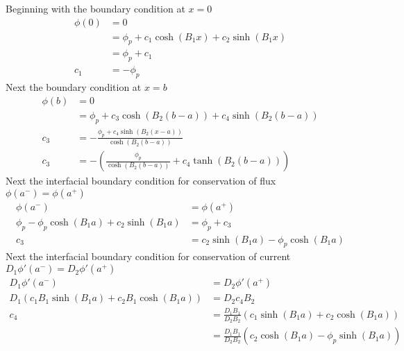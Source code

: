   Beginning with the boundary condition at $x=0$
  \begin{align}
    \phi(0) &= 0 \\
    &= \phi_p + c_1 \cosh(B_1 x) + c_2 \sinh(B_1 x) \\
    &= \phi_p + c_1\\
    c_1 &= -\phi_p \label{eq:bc_x0}
  \end{align}
  Next the boundary condition at $x=b$
  \begin{align}
    \phi(b) &= 0 \\
    &= \phi_p + c_3 \cosh(B_2 (b-a)) + c_4 \sinh(B_2 (b-a)) \\
    c_3 &= - \frac{\phi_p + c_4 \sinh(B_2(x-a))}{\cosh(B_2(b-a))} \\
    c_3 &= - \left(\frac{\phi_p}{\cosh(B_2(b-a))} + 
      c_4 \tanh(B_2(b-a))\right) \label{eq:bc_xb}
  \end{align}
  Next the interfacial boundary condition for conservation of flux
  $\phi(a^-)=\phi(a^+)$
  \begin{align}
    \phi(a^-) &= \phi(a^+) \\
    \phi_p - \phi_p \cosh(B_1 a) + c_2 \sinh(B_1 a) &= 
      \phi_p + c_3 \\
    c_3 &= c_2 \sinh(B_1 a) - \phi_p \cosh(B_1 a) \label{eq:bc_flux}
  \end{align}
  Next the interfacial boundary condition for conservation of current
  ${D_1 \phi'(a^-) = D_2 \phi'(a^+)}$
  \begin{align}
    D_1 \phi'(a^-) &= D_2 \phi'(a^+) \\
    D_1 (c_1 B_1 \sinh(B_1 a) + c_2 B_1 \cosh(B_1 a)) &=
      D_2 c_4 B_2 \\
    c_4 &= \frac{D_1 B_1}{D_2 B_2} (c_1 \sinh(B_1 a) + c_2 \cosh(B_1 a)) \\
    &= \frac{D_1 B_1}{D_2 B_2}(c_2 \cosh(B_1 a) - \phi_p \sinh(B_1 a))
      \label{eq:bc_current}
  \end{align}
  
